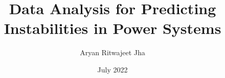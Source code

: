 \documentclass[MS,synopsis]{iitddiss}
\title{Data Analysis for Predicting Instabilities in Power Systems}
\author{Aryan Ritwajeet Jha}
\date{July 2022}
\begin{document}
\maketitle

\setcounter{page}{0}

\newpage

\renewcommand{\contentsname}{Proposed Contents of the Thesis}
\tableofcontents

\newpage


















\printbibliography
\end{document}

